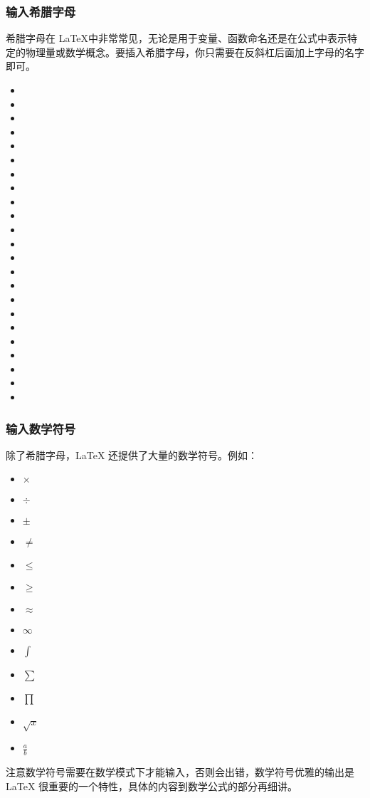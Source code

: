 {\subsubsection{输入希腊字母}
希腊字母在 \LaTeX 中非常常见，无论是用于变量、函数命名还是在公式中表示特定的物理量或数学概念。要插入希腊字母，你只需要在反斜杠后面加上字母的名字即可。
\begin{texlst}
\begin{itemize}[nosep]
\item \alpha
\item \beta
\item \gamma\quad\Gamma
\item \delta\quad\Delta
\item \epsilon
\item \zeta
\item \eta
\item \theta\quad\Theta
\item \iota
\item \kappa
\item \lambda\quad\Lambda
\item \mu
\item \nu
\item \xi\quad\Xi
\item \pi\quad\Pi
\item \rho
\item \sigma\quad\Sigma
\item \tau
\item \upsilon\quad\Upsilon
\item \phi\quad\Phi
\item \chi
\item \psi\quad\Psi
\item \omega\quad\Omega
\end{itemize}
\end{texlst}

\pagebreak

\subsubsection{输入数学符号}
除了希腊字母，LaTeX 还提供了大量的数学符号。例如：
\begin{texlst}
\begin{itemize}[nosep]
	\item $\times$
	\item $\div$
	\item $\pm$
	\item $\neq$
	\item $\leq$
	\item $\geq$
	\item $\approx$
	\item $\infty$
	\item $\int$
	\item $\sum$
	\item $\prod$
	\item $\sqrt{x}$
	\item $\frac{a}{b}$
\end{itemize}
\end{texlst}
注意数学符号需要在数学模式下才能输入，否则会出错，数学符号优雅的输出是\LaTeX
很重要的一个特性，具体的内容到数学公式的部分再细讲。
\vfill
\pagebreak
}
